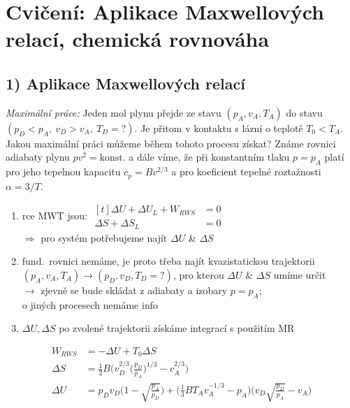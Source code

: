 \section{Cvičení: Aplikace Maxwellových relací, chemická rovnováha}

\subsection*{1) Aplikace Maxwellových relací}
\begin{priklad}
\emph{Maximální práce:} Jeden mol plynu přejde ze stavu $(p_A, v_A, T_A)$ do stavu $(p_D < p_A,\ v_D > v_A,\ T_D = ?)$. Je přitom
v kontaktu s lázní o teplotě $T_0 < T_A$. Jakou maximální práci můžeme během tohoto procesu získat? Známe rovnici adiabaty plynu
$pv^2 = \text{konst.}$ a dále víme, že při konstantním tlaku $p = p_A$ platí pro jeho tepelnou kapacitu $c_p = Bv^{2/3}$ a pro
koeficient tepelné roztažnosti $\alpha = 3/T$.
\end{priklad}

{\color{NavyBlue}
\begin{enumerate}[label=\roman*)]
  \item rce MWT jsou: \quad
        $\begin{aligned}[t] \Delta U + \Delta U_L + W_{RWS} &= 0 \\ \Delta S + \Delta S_L &= 0 \end{aligned}$ \\[2pt]
        \quad $\Rightarrow$ pro systém potřebujeme najít $\Delta U$ \& $\Delta S$
  \item fund.\ rovnici nemáme, je proto třeba najít kvazistatickou trajektorii \\ $(p_A, v_A, T_A)\to(p_D, v_D, T_D = ?)$, pro kterou
        $\Delta U$ \& $\Delta S$ umíme určit \\
        $\to$ zjevně se bude skládat z adiabaty a izobary $p = p_A$; \\ \phantom{$\to$} o jiných procesech nemáme info
  \item $\Delta U, \Delta S$ po zvolené trajektorii získáme integrací s použitím MR
\end{enumerate}}
{\color{Red}
\begin{align*}
  W_{RWS} &= -\Delta U + T_0\Delta S \\
  \Delta S &= \tfrac12 B\Big(v_D^{2/3}\Big(\frac{p_D}{p_A}\Big)^{1/3} - v_A^{2/3}\Big) \\
  \Delta U &= p_Dv_D\Big(1 - \sqrt{\frac{p_A}{p_D}}\Big) + \Big(\tfrac13BT_Av_A^{-1/3} - p_A\Big)\Big(v_D\sqrt{\frac{p_D}{p_A}} - v_A\Big)
\end{align*}}

